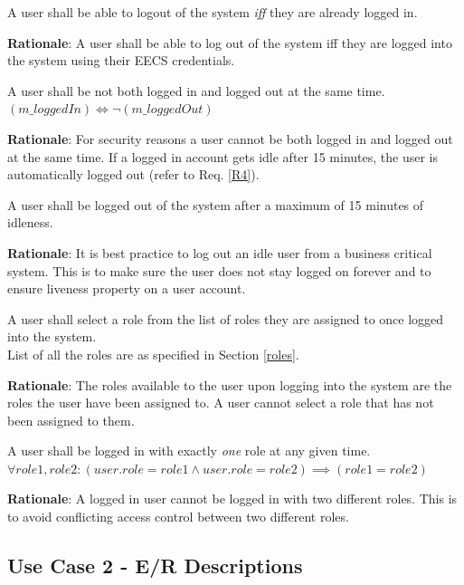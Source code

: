 \documentclass[fontsize=12pt,paper=letter,twoside]{scrartcl}
\begin{document}
\genreq
{A user shall be able to logout of the system \emph{iff} they are already logged in.\\}
{}
\label{R2}

\smallskip
\noindent \textbf{Rationale}: A user shall be able to log out of the system iff they are logged into the system using their EECS credentials.

\rdescription
{A user shall be not both logged in and logged out at the same time.\\}
{$(m\_loggedIn) \iff \neg (m\_loggedOut)$}
\label{R3}

\smallskip
\noindent \textbf{Rationale}: For security reasons a user cannot be both logged in and logged out at the same time. If a logged in account gets idle after 15 minutes, the user is automatically logged out (refer to Req. \ref{R4}).

\genreq
{A user shall be logged out of the system after a maximum of 15 minutes of idleness.\\}
{}
\label{R4}

\smallskip
\noindent \textbf{Rationale}: It is best practice to log out an idle user from a business critical system. This is to make sure the user does not stay logged on forever and to ensure liveness property on a user account.

\rdescription
{A user shall select a role from the list of roles they are assigned to once logged into the system.\\}
{List of all the roles are as specified in Section \ref{roles}.}
\label{R5}

\smallskip
\noindent \textbf{Rationale}: The roles available to the user upon logging into the system are the roles the user have been assigned to. A user cannot select a role that has not been assigned to them.

\rdescription
{A user shall be logged in with exactly \emph{one} role at any given time.\\}
{$\forall role1, role2 : (user.role = role1 \land user.role = role2) \implies (role1 = role2)$}
\label{R6}

\smallskip
\noindent \textbf{Rationale}: A logged in user cannot be logged in with two different roles. This is to avoid conflicting access control between two different roles.

\subsection{Use Case 2 - E/R Descriptions}
\end{document}
